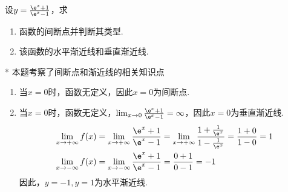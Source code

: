 \begin{problem}
    设$y=\frac{\e^x+1}{\e^x-1}$，求
    \begin{enumerate}
        \item 函数的间断点并判断其类型.
        \item 该函数的水平渐近线和垂直渐近线.
    \end{enumerate}
\end{problem}
\begin{draft}
    \vspace{5em}
\end{draft}
\begin{solution}*
    本题考察了间断点和渐近线的相关知识点

\begin{enumerate}
    \item 当$x=0$时，函数无定义，因此$x=0$为间断点.
    \item 当$x=0$时，函数无定义，$\lim_{x\to 0} \frac{\e^x+1}{\e^x-1}=\infty$，因此$x=0$为垂直渐近线.
    \[\begin{aligned}
        \lim_{x\to +\infty} f(x)&=\lim_{x\to +\infty} \frac{\e^x+1}{\e^x-1}=\lim_{x\to +\infty} \frac{1+\frac{1}{\e^x}}{1-\frac{1}{\e^x}}=\frac{1+0}{1-0}=1\\
        \lim_{x\to -\infty} f(x)&=\lim_{x\to -\infty} \frac{\e^x+1}{\e^x-1}=\frac{0+1}{0-1}=-1
    \end{aligned}\]
    因此，$y=-1,y=1$为水平渐近线.
\end{enumerate}
\end{solution}

